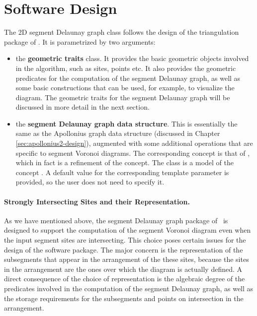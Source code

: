 \section{Software Design\label{sec:sdg2-design}}

The 2D segment Delaunay graph class
follows the design of the triangulation package of \cgal. It is
parametrized by two arguments:
\begin{itemize}
\item the {\bf geometric traits} class. It provides the basic
  geometric objects involved in the algorithm, such as sites, points
  etc. It also provides the geometric predicates for the computation
  of the segment Delaunay graph, as well as some basic constructions
  that can be used, for example, to visualize the diagram.
  The geometric traits for the segment Delaunay graph will be
  discussed in more detail in the next section.
\item the {\bf segment Delaunay graph data structure}. This is
  essentially the same as the Apollonius graph data structure (discussed
  in Chapter \ref{sec:apollonius2-design}), augmented with some
  additional operations that are specific to segment Voronoi
  diagrams. The corresponding concept is that of
  , which in fact is a refinement
  of the  concept. The class
   is a model of
  the concept . A default value
  for the corresponding template parameter is provided, so the user
  does not need to specify it.
\end{itemize}


\paragraph{Strongly Intersecting Sites and their Representation.}
As we have mentioned above, the segment Delaunay graph package of
\cgal\ is designed to support the computation of the segment Voronoi
diagram even when the input segment sites are intersecting. This
choice poses certain issues for the design of the software
package. The major concern is the representation of the subsegments
that appear in the arrangement of the these sites, because the sites
in the arrangement are the ones over which the diagram is actually
defined. A direct consequence of the choice of representation is the
algebraic degree of the predicates involved in the computation of the
segment Delaunay graph, as well as the storage requirements for the
subsegments and points on intersection in the arrangement.

